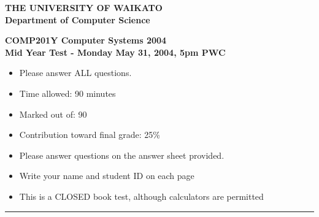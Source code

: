 \documentclass[a4paper,10pt]{article}
\begin{document}
\newcommand{\marks}[1]
{\begin{flushright}{\bf (#1 marks)}\end{flushright}}

{\centering \large \bf THE UNIVERSITY OF WAIKATO\\}
{\centering \large \bf Department of Computer Science\\[0.5cm]}

{\centering \large \bf COMP201Y Computer Systems 2004 \\}
{\centering \large \bf Mid Year Test - Monday May 31, 2004, 5pm PWC \\[1cm]}

\begin{itemize}
  \item Please answer ALL questions.

  \item Time allowed: 90 minutes

  \item Marked out of: 90

  \item Contribution toward final grade: 25\%
  
  \item Please answer questions on the answer sheet provided. 

  \item Write your name and student ID on each page

  \item This is a CLOSED book test, although calculators are permitted
\end{itemize}

\hrule
\end{document}
